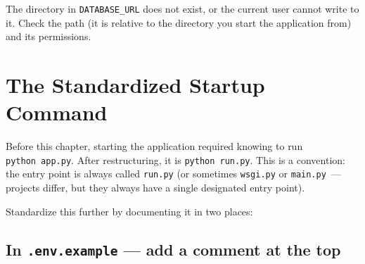 The directory in \texttt{DATABASE\_URL} does not exist, or the current user cannot write to it. Check the path (it is relative to the directory you start the application from) and its permissions.

\setcounter{section}{9}
\section{The Standardized Startup Command}\label{15-structuring-the-application:1510-the-standardized-startup-command}

Before this chapter, starting the application required knowing to run \texttt{python\ app.py}. After restructuring, it is \texttt{python\ run.py}. This is a convention: the entry point is always called \texttt{run.py} (or sometimes \texttt{wsgi.py} or \texttt{main.py}~--- projects differ, but they always have a single designated entry point).

Standardize this further by documenting it in two places:

\subsection*{\texorpdfstring{In \texttt{.env.example} --- add a comment at the top}{In .env.example --- add a comment at the top}}\label{15-structuring-the-application:in-envexample--add-a-comment-at-the-top}

\begin{codebox}[short]

\begin{Shaded}
\begin{Highlighting}[]

\OperatorTok{=}
\OperatorTok{=}
\OperatorTok{=}
\OperatorTok{=}
\OperatorTok{=}
\end{Highlighting}
\end{Shaded}

\end{codebox}

